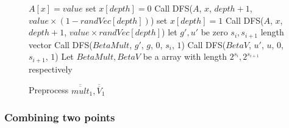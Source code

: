 \begin{figure}[p]
\begin{algorithm}[H]
\label{alg::parttwo}
\caption{Preprocess $\overline{\overline{mult}}_1, \overline{\overline{V}}_1$}
\begin{algorithmic}[1]
		\State $A[x]=value$
	\Else
		\State set $x[depth]=0$
		\State Call DFS($A$, $x$, $depth + 1$, $value \times (1-randVec[depth])$)
		\State set $x[depth]=1$
		\State Call DFS($A$, $x$, $depth + 1$, $value \times randVec[depth]$)
	\EndIf
\EndProcedure
{}
	\State let $g', u'$ be zero $s_{i}, s_{i+1}$ length vector
	\State Call DFS($BetaMult$, $g'$, $g$, $0$, $s_{i}$, $1$)
	\State Call DFS($BetaV$, $u'$, $u$, $0$, $s_{i + 1}$, $1$)
\EndProcedure
{}
	\State Let $BetaMult, BetaV$ be a array with length $2^{s_{i}}, 2^{s_{i+1}}$ respectively
	\State 
\EndProcedure
\end{algorithmic}
\end{algorithm}
\end{figure}

\subsubsection{Combining two points}